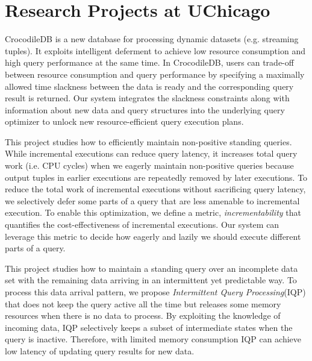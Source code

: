 \documentclass[10pt]{article} %
\begin{document}
\vspace{-5mm}

\section{Research Projects at UChicago}

{CrocodileDB is a new database for processing dynamic datasets (e.g. streaming tuples). 
It exploits intelligent deferment to achieve low resource consumption 
and high query performance at the same time. 
In CrocodileDB, users can trade-off between resource consumption and query performance 
by specifying a maximally allowed time slackness 
between the data is ready and the corresponding query result is returned. 
Our system integrates the slackness constraints along with information 
about new data and query structures into the underlying query optimizer 
to unlock new resource-efficient query execution plans.}

{This project studies how to efficiently maintain non-positive standing queries. 
While incremental executions can reduce query latency, it increases total query work (i.e. CPU cycles) 
when we eagerly maintain non-positive queries 
because output tuples in earlier executions are repeatedly removed by later executions. 
To reduce the total work of incremental executions without sacrificing query latency, 
we selectively defer some parts of a query that are less amenable to incremental execution. 
To enable this optimization, we define a metric, \textit{incrementability} that 
quantifies the cost-effectiveness of incremental executions. 
Our system can leverage this metric to decide how eagerly and lazily we should execute different parts of a query.}

{This project studies how to maintain a standing query 
over an incomplete data set with the remaining data
arriving in an intermittent yet predictable way. 
To process this data arrival pattern, 
we propose \textit{Intermittent Query Processing}(IQP) 
that does not keep the query active all the time but releases some memory resources when there is no data to process. 
By exploiting the knowledge of incoming data, 
IQP selectively keeps a subset of intermediate states when the query is inactive. 
Therefore, with limited memory consumption IQP can achieve low latency of updating query results for new data.}
\end{document}

